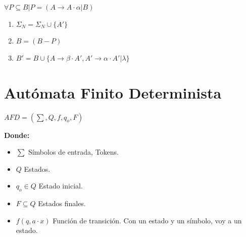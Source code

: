 \documentclass[12pt, twoside, openright]{report} %
\begin{document}
$\forall P \subseteq B | P = (A \rightarrow A \cdot \alpha | B)$
\begin{enumerate}
	\item $\Sigma_N = \Sigma_N \cup \{ A'\}$
	\item $B = (B - P)$
	\item $B' = B \cup \{ A \rightarrow \beta \cdot A',{ } A' \rightarrow \alpha \cdot A' | \lambda \}$
\end{enumerate}

\section{Autómata Finito Determinista}

\(AFD=( \sum, Q, f, q_o, F)\)

\textbf{Donde:}

\begin{itemize}
	\item \(\sum\) Símbolos de entrada, Tokens.
	\item \(Q\) Estados.
	\item \(q_o \in Q\) Estado inicial.
	\item \(F \subseteq Q\) Estados finales.
	\item \(f(q,a \cdot x)\) Función de transición. Con un estado y un símbolo,
	      voy a un estado.
\end{itemize}
\end{document}
